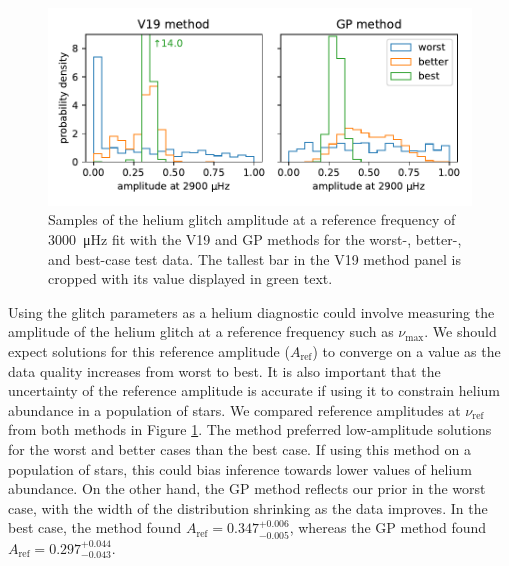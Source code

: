 \begin{figure}
    \centering
    \includegraphics{figures/glitch-test-amplitude.pdf}
    \caption{Samples of the helium glitch amplitude at a reference frequency of \SI{3000}{\micro\hertz} fit with the V19 and GP methods for the worst-, better-, and best-case test data. The tallest bar in the V19 method panel is cropped with its value displayed in green text.}
    \label{fig:glitch-test-amplitude}
\end{figure}

Using the glitch parameters as a helium diagnostic could involve measuring the amplitude of the helium glitch at a reference frequency such as \(\nu_{\max}\). We should expect solutions for this reference amplitude (\(A_\mathrm{ref}\)) to converge on a value as the data quality increases from worst to best. It is also important that the uncertainty of the reference amplitude is accurate if using it to constrain helium abundance in a population of stars. We compared reference amplitudes at \(\nu_\mathrm{ref}\) from both methods in Figure \ref{fig:glitch-test-amplitude}. The  method preferred low-amplitude solutions for the worst and better cases than the best case. If using this method on a population of stars, this could bias inference towards lower values of helium abundance. On the other hand, the GP method reflects our prior in the worst case, with the width of the distribution shrinking as the data improves. In the best case, the  method found \(A_\mathrm{ref} = 0.347_{-0.005}^{+0.006}\), whereas the GP method found \(A_\mathrm{ref} = 0.297_{-0.043}^{+0.044}\).


